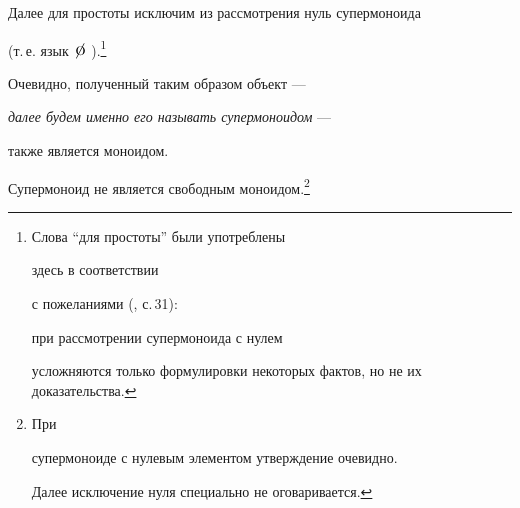 \setcounter{footnote}{0}





 Далее для простоты исключим из рассмотрения нуль супермоноида


 (т.\,е. язык $\mbox{\large $\not\!\mbox{\Large o}\;$}$).\footnote{Слова ``для простоты'' были употреблены 


здесь в соответствии


 с пожеланиями (\cite{litl}, с.\,31):


 при рассмотрении супермоноида с нулем


 усложняются только формулировки некоторых фактов, но не их доказательства.}


 Очевидно, полученный таким образом объект ---


 {\it далее будем именно его называть супермоноидом} ---


 также является моноидом.





 \begin{props} \label{NoFree}


 Супермоноид не является свободным моноидом.\footnote{При 


супермоноиде с нулевым элементом утверждение очевидно.


Далее исключение нуля специально не оговаривается.}


 \end{props}





